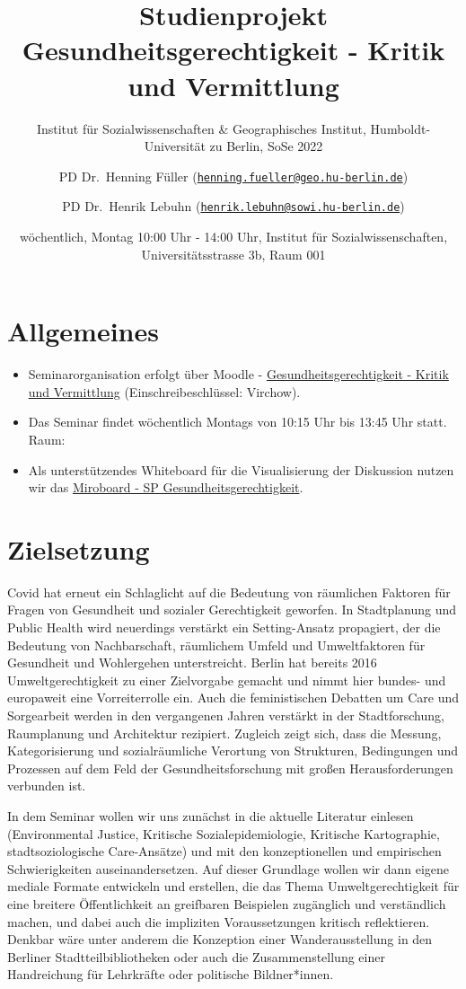 \documentclass[
  ngerman,
]{article}
\title{Studienprojekt Gesundheitsgerechtigkeit - Kritik und Vermittlung}
\subtitle{Institut für Sozialwissenschaften \& Geographisches Institut, Humboldt-Universität zu Berlin, SoSe 2022}
\author{PD Dr.~Henning Füller (\href{mailto:henning.fueller@geo.hu-berlin.de}{\nolinkurl{henning.fueller@geo.hu-berlin.de}}) \and PD Dr.~Henrik Lebuhn (\href{mailto:henrik.lebuhn@sowi.hu-berlin.de}{\nolinkurl{henrik.lebuhn@sowi.hu-berlin.de}})}
\date{wöchentlich, Montag 10:00 Uhr - 14:00 Uhr, Institut für Sozialwissenschaften, Universitätsstrasse 3b, Raum 001}
\begin{document}
\maketitle

{
\hypersetup{linkcolor=}
\setcounter{tocdepth}{2}
\tableofcontents
}
\newpage

\hypertarget{allgemeines}{%
\section*{Allgemeines}\label{allgemeines}}

\begin{itemize}
\item
  Seminarorganisation erfolgt über Moodle - \href{https://moodle.hu-berlin.de/course/view.php?id=110268}{Gesundheitsgerechtigkeit - Kritik und Vermittlung} (Einschreibeschlüssel: Virchow).
\item
  Das Seminar findet wöchentlich Montags von 10:15 Uhr bis 13:45 Uhr statt. Raum:
\item
  Als unterstützendes Whiteboard für die Visualisierung der Diskussion nutzen wir das \href{https://miro.com/app/board/uXjVOF6MyAc=/?invite_link_id=891179698806}{Miroboard - SP Gesundheitsgerechtigkeit}.
\end{itemize}

\hypertarget{zielsetzung}{%
\section*{Zielsetzung}\label{zielsetzung}}

Covid hat erneut ein Schlaglicht auf die Bedeutung von räumlichen Faktoren für Fragen von Gesundheit und sozialer Gerechtigkeit geworfen. In Stadtplanung und Public Health wird neuerdings verstärkt ein Setting-Ansatz propagiert, der die Bedeutung von Nachbarschaft, räumlichem Umfeld und Umweltfaktoren für Gesundheit und Wohlergehen unterstreicht. Berlin hat bereits 2016 Umweltgerechtigkeit zu einer Zielvorgabe gemacht und nimmt hier bundes- und europaweit eine Vorreiterrolle ein. Auch die feministischen Debatten um Care und Sorgearbeit werden in den vergangenen Jahren verstärkt in der Stadtforschung, Raumplanung und Architektur rezipiert. Zugleich zeigt sich, dass die Messung, Kategorisierung und sozialräumliche Verortung von Strukturen, Bedingungen und Prozessen auf dem Feld der Gesundheitsforschung mit großen Herausforderungen verbunden ist.

In dem Seminar wollen wir uns zunächst in die aktuelle Literatur einlesen (Environmental Justice, Kritische Sozialepidemiologie, Kritische Kartographie, stadtsoziologische Care-Ansätze) und mit den konzeptionellen und empirischen Schwierigkeiten auseinandersetzen. Auf dieser Grundlage wollen wir dann eigene mediale Formate entwickeln und erstellen, die das Thema Umweltgerechtigkeit für eine breitere Öffentlichkeit an greifbaren Beispielen zugänglich und verständlich machen, und dabei auch die impliziten Voraussetzungen kritisch reflektieren. Denkbar wäre unter anderem die Konzeption einer Wanderausstellung in den Berliner Stadtteilbibliotheken oder auch die Zusammenstellung einer Handreichung für Lehrkräfte oder politische Bildner*innen.
\end{document}
